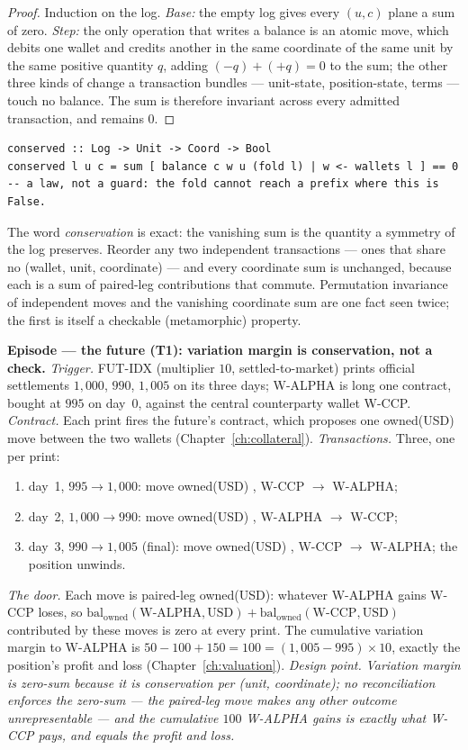 \begin{proof}
Induction on the log. \emph{Base:} the empty log gives every $(u,c)$ plane a sum
of zero. \emph{Step:} the only operation that writes a balance is an atomic move,
which debits one wallet and credits another in the same coordinate of the same
unit by the same positive quantity $q$, adding $(-q)+(+q)=0$ to the sum; the
other three kinds of change a transaction bundles --- unit-state, position-state,
terms --- touch no balance. The sum is therefore invariant across every admitted
transaction, and remains $0$.
\end{proof}

\begin{lstlisting}
conserved :: Log -> Unit -> Coord -> Bool
conserved l u c = sum [ balance c w u (fold l) | w <- wallets l ] == 0
-- a law, not a guard: the fold cannot reach a prefix where this is False.
\end{lstlisting}

The word \emph{conservation} is exact: the vanishing sum is the quantity a
symmetry of the log preserves. Reorder any two independent transactions --- ones
that share no (wallet, unit, coordinate) --- and every coordinate sum is
unchanged, because each is a sum of paired-leg contributions that commute.
Permutation invariance of independent moves and the vanishing coordinate sum are
one fact seen twice; the first is itself a checkable (metamorphic) property.

\medskip\noindent\textbf{Episode --- the future (T1): variation margin is
conservation, not a check.}
\emph{Trigger.} FUT-IDX (multiplier $10$, settled-to-market) prints official
settlements $1{,}000$, $990$, $1{,}005$ on its three days; W-ALPHA is long one
contract, bought at $995$ on day~0, against the central counterparty wallet
W-CCP. \emph{Contract.} Each print fires the future's contract, which proposes one
owned(USD) move between the two wallets (Chapter~\ref{ch:collateral}).
\emph{Transactions.} Three, one per print:
\begin{enumerate}[label=(\arabic*),nosep,leftmargin=2.2em]
\item day~1, $995\!\to\!1{,}000$: move owned(USD) , W-CCP $\to$ W-ALPHA;
\item day~2, $1{,}000\!\to\!990$: move owned(USD) , W-ALPHA $\to$ W-CCP;
\item day~3, $990\!\to\!1{,}005$ (final): move owned(USD) , W-CCP $\to$
  W-ALPHA; the position unwinds.
\end{enumerate}
\emph{The door.} Each move is paired-leg owned(USD): whatever W-ALPHA gains W-CCP
loses, so $\mathrm{bal}_{\text{owned}}(\text{W-ALPHA},\text{USD}) +
\mathrm{bal}_{\text{owned}}(\text{W-CCP},\text{USD})$ contributed by these moves is
zero at every print. The cumulative variation margin to W-ALPHA is
$50-100+150 = 100 = (1{,}005-995)\times 10$, exactly the position's profit and
loss (Chapter~\ref{ch:valuation}).
\emph{Design point.} \emph{Variation margin is zero-sum because it is
conservation per (unit, coordinate); no reconciliation enforces the zero-sum ---
the paired-leg move makes any other outcome unrepresentable --- and the cumulative
$100$ W-ALPHA gains is exactly what W-CCP pays, and equals the profit and loss.}


